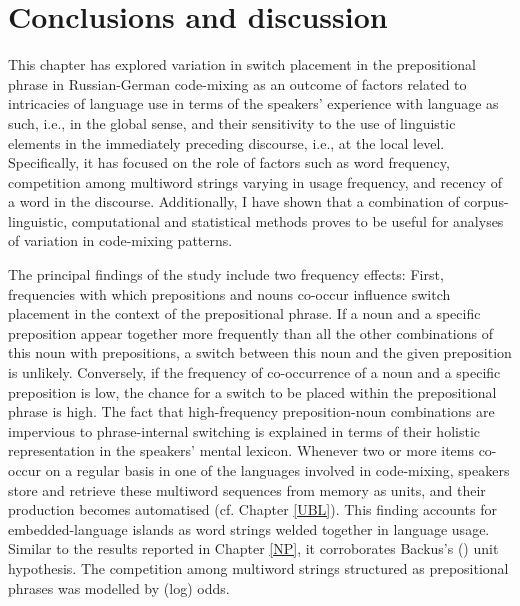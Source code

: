 \section{Conclusions and discussion}

This chapter has explored variation in switch placement in the prepositional phrase in Russian-German code-mixing as an outcome of factors related to intricacies of language use in terms of the speakers’ experience with language as such, i.e., in the global sense, and their sensitivity to the use of linguistic elements in the immediately preceding discourse, i.e., at the local level. Specifically, it has focused on the role of factors such as word frequency, competition among multiword strings varying in usage frequency, and recency of a word in the discourse. Additionally, I have shown that a combination of corpus-linguistic, computational and statistical methods proves to be useful for analyses of variation in code-mixing patterns.

The principal findings of the study include two frequency effects: First, frequencies with which prepositions and nouns co-occur influence switch placement in the context of the prepositional phrase. If a noun and a specific preposition appear together more frequently than all the other combinations of this noun with prepositions, a switch between this noun and the given preposition is unlikely. Conversely, if the frequency of co-occurrence of a noun and a specific preposition is low, the chance for a switch to be placed within the prepositional phrase is high. The fact that high-frequency preposition-noun combinations are impervious to phrase-internal switching is explained in terms of their holistic representation in the speakers' mental lexicon. Whenever two or more items co-occur on a regular basis in one of the languages involved in code-mixing, speakers store and retrieve these multiword sequences from memory as units, and their production becomes automatised (cf. Chapter \ref{UBL}). This finding accounts for embedded-language islands as word strings welded together in language usage. Similar to the results reported in Chapter \ref{NP}, it  corroborates Backus’s (\citeyear{backus-units-2003}) unit hypothesis. The competition among multiword strings structured as prepositional phrases was modelled by (log) odds. 

